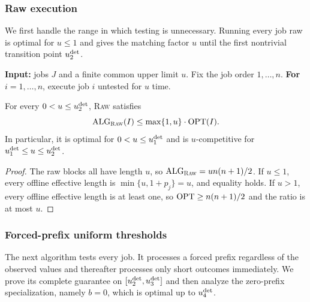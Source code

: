 \subsubsection{Raw execution}
\label{sec:opt:low-upper}

We first handle the range in which testing is unnecessary.  Running every
job raw is optimal for $u\le1$ and gives the matching factor $u$ until the
first nontrivial transition point $u_{2}^{\mathrm{det}}$.

\begin{algorithm}[H]
\caption{}
\label{alg:raw}
\begin{algorithmic}
\Statex \textbf{Input:} jobs $J$ and a finite common upper limit $u$.
\State Fix the job order $1,\ldots,n$.
\State \textbf{For} $i=1,\ldots,n$, execute job $i$ untested for $u$ time.
\end{algorithmic}
\end{algorithm}

\begin{lemma}
\label{lem:opt:raw-upper}
For every $0<u\le u_{2}^{\mathrm{det}}$, \textnormal{\textsc{Raw}} satisfies
\begin{equation}
 \operatorname{ALG}_{\textnormal{\textsc{Raw}}}(I)\le \max\{1,u\}\cdot\operatorname{OPT}(I).
 \label{eq:opt:raw-upper}
\end{equation}
In particular, it is optimal for $0<u\le u_{1}^{\mathrm{det}}$ and is $u$-competitive
for $u_{1}^{\mathrm{det}}\le u\le u_{2}^{\mathrm{det}}$.
\end{lemma}

\begin{proof}
The raw blocks all have length $u$, so
$\operatorname{ALG}_{\textnormal{\textsc{Raw}}}=u n(n+1)/2$.  If $u\le1$, every offline effective
length is $\min\{u,1+p_j\}=u$, and equality holds.  If $u>1$, every offline
effective length is at least one, so
$\operatorname{OPT}\ge n(n+1)/2$ and the ratio is at most $u$.
\end{proof}

\subsubsection{Forced-prefix uniform thresholds}
\label{sec:opt:forced-prefix-upper}

The next algorithm tests every job.  It processes a forced prefix regardless
of the observed values and thereafter processes only short outcomes
immediately.  We prove its complete guarantee on
$[u_{2}^{\mathrm{det}},u_{3}^{\mathrm{det}}]$ and then analyze the zero-prefix specialization,
namely $b=0$, which is optimal up to $u_{4}^{\mathrm{det}}$.

